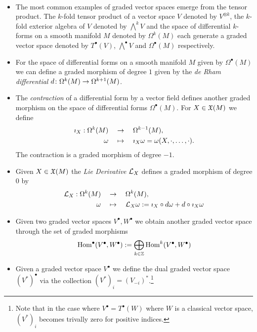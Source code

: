 \begin{example}~
  \begin{itemize}
    \item The most common examples of graded vector spaces emerge from the tensor product. The $k$-fold tensor product of a vector space $V$ denoted by $V^{\otimes k}$, the $k$-fold exterior algebra of $V$ denoted by $\bigwedge^k V$ and the space of differential $k$-forms on a smooth manifold $M$ denoted by $\Omega^k(M)$ each generate a graded vector space denoted by $T^\bullet(V)$, $\bigwedge^\bullet V$ and $\Omega^\bullet(M)$ respectively.

    \item For the space of differential forms on a smooth manifold $M$ given by $\Omega^\bullet(M)$ we can define a  graded morphism of degree $1$ given by the \emph{de Rham differential} $d\colon \Omega^k(M) \rightarrow \Omega^{k+1}(M)$.

    \item The \emph{contraction} of a differential form by a vector field defines another graded morphism on the space of differential forms $\Omega^\bullet(M)$. For $X \in \mathfrak{X}(M)$ we define
     \begin{align*}
       \imath_X : \Omega^k(M)\quad &\rightarrow \quad\Omega^{k-1}(M),\\
       \omega\quad  &\mapsto \quad \imath_X\omega = \omega (X, \cdot, \dots, \cdot).
     \end{align*}
    The contraction is a graded morphism of degree $-1$.

    \item Given $X \in \mathfrak{X}(M)$ the \emph{Lie Derivative} $\mathcal{L}_{X}$ defines a graded morphism of degree $0$ by
      \begin{align*}
        \mathcal{L}_{X} : \Omega^k(M)\quad &\rightarrow \quad\Omega^{k}(M),\\
        \omega\quad  &\mapsto \quad \mathcal{L}_{X}\omega := \imath_X \circ d\omega + d \circ \imath_X\omega
      \end{align*}

    \item Given two graded vector spaces $V^\bullet, W^\bullet$ we obtain another graded vector space through the set of graded morphisms
    $$ \operatorname{Hom}^\bullet(V^\bullet, W^\bullet) := \bigoplus_{k\in\mathbb{Z}} \operatorname{Hom}^k(V^\bullet, W^\bullet) $$

     \item Given a graded vector space $V^\bullet$ we define the dual graded vector space $(V^*)^\bullet$ via the collection $(V^*)_i=(V_{-i})^*$.\footnote{Note that in the case where $V^\bullet=T^\bullet(W)$ where $W$ is a classical vector space, $(V^*)_i$  becomes trivally zero for positive indices.}
  \end{itemize}
\end{example}

